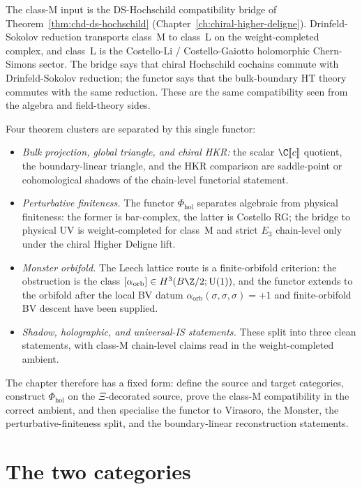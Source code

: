 The class-M input is the DS-Hochschild compatibility bridge of
Theorem~\ref*{thm:chd-ds-hochschild}
(Chapter~\ref*{ch:chiral-higher-deligne}). Drinfeld-Sokolov reduction
transports class~M to class~L on the weight-completed complex, and
class~L is the Costello-Li / Costello-Gaiotto holomorphic
Chern-Simons sector. The bridge says that chiral Hochschild cochains
commute with Drinfeld-Sokolov reduction; the functor says that the
bulk-boundary HT theory commutes with the same reduction. These are
the same compatibility seen from the algebra and field-theory sides.

Four theorem clusters are separated by this single functor:
\begin{itemize}[leftmargin=1.3em]
\item \emph{Bulk projection, global triangle, and chiral HKR:} the
 scalar $\C[\![c]\!]$ quotient, the boundary-linear triangle, and
 the HKR comparison are saddle-point or cohomological shadows of the
 chain-level functorial statement.
\item \emph{Perturbative finiteness.} The functor $\Phi_{\mathrm{hol}}$
 separates algebraic from physical finiteness: the former is
 bar-complex, the latter is Costello RG; the bridge to physical UV is
 weight-completed for class~M and strict $E_3$ chain-level only under
 the chiral Higher Deligne lift.
\item \emph{Monster orbifold.} The Leech lattice route is a
finite-orbifold criterion: the obstruction is the class
$[\alpha_{\mathrm{orb}}]\in H^3(B\Z/2;\mathrm{U}(1))$, and the
functor extends to the orbifold after the local BV datum
$\alpha_{\mathrm{orb}}(\sigma,\sigma,\sigma)=+1$ and
finite-orbifold BV descent have been supplied.
\item \emph{Shadow, holographic, and universal-IS statements.} These
 split into three clean statements, with class-M chain-level claims
 read in the weight-completed ambient.
\end{itemize}

The chapter therefore has a fixed form: define the source and target
categories, construct $\Phi_{\mathrm{hol}}$ on the $\Xi$-decorated
source, prove the class-M compatibility in the correct ambient, and
then specialise the functor to Virasoro, the Monster, the
perturbative-finiteness split, and the boundary-linear reconstruction
statements.

\section{The two categories}
\label{sec:uhf-setup}

